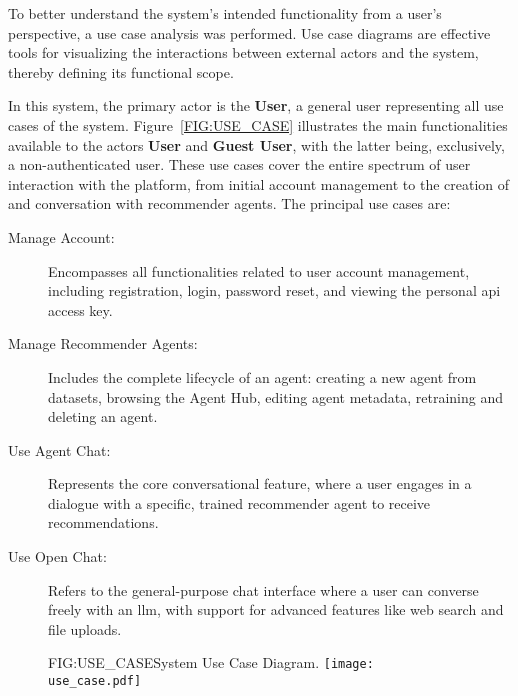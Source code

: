 To better understand the system's intended functionality from a user's perspective, a use case analysis was performed. Use case diagrams are effective tools for visualizing the interactions between external actors and the system, thereby defining its functional scope.

In this system, the primary actor is the \textbf{User}, a general user representing all use cases of the system. Figure~\ref{FIG:USE_CASE} illustrates the main functionalities available to the actors \textbf{User} and \textbf{Guest User}, with the latter being, exclusively, a non-authenticated user. These use cases cover the entire spectrum of user interaction with the platform, from initial account management to the creation of and conversation with recommender agents. The principal use cases are:

\begin{description}
    \item[Manage Account:] Encompasses all functionalities related to user account management, including registration, login, password reset, and viewing the personal \acs{api} access key.
    \item[Manage Recommender Agents:] Includes the complete lifecycle of an agent: creating a new agent from datasets, browsing the Agent Hub, editing agent metadata, retraining and deleting an agent.
    \item[Use Agent Chat:] Represents the core conversational feature, where a user engages in a dialogue with a specific, trained recommender agent to receive recommendations.
    \item[Use Open Chat:] Refers to the general-purpose chat interface where a user can converse freely with an \ac{llm}, with support for advanced features like web search and file uploads.
\end{description}

\begin{figure}[System Use Case Diagram]{FIG:USE_CASE}{System Use Case Diagram.}
    \centering
    \texttt{[image: use\_case.pdf]}
\end{figure}
